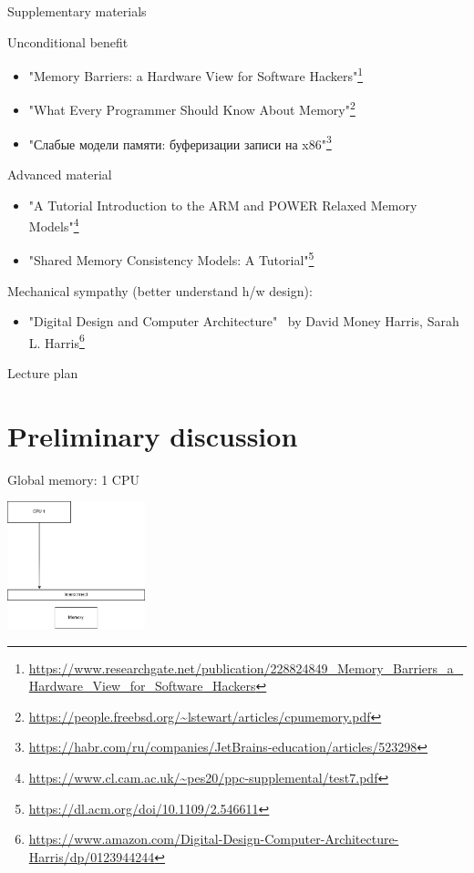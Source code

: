 \begin{frame}{Supplementary materials}

Unconditional benefit
\begin{itemize}
  \item "Memory Barriers: a Hardware View for Software Hackers"\footnote{\tiny\url{https://www.researchgate.net/publication/228824849_Memory_Barriers_a_Hardware_View_for_Software_Hackers}}
  \item "What Every Programmer Should Know About Memory"\footnote{\tiny\url{https://people.freebsd.org/~lstewart/articles/cpumemory.pdf}}
  \item "Слабые модели памяти: буферизации записи на x86"\footnote{\tiny\url{https://habr.com/ru/companies/JetBrains-education/articles/523298}}
\end{itemize}

Advanced material
\begin{itemize}
  \item "A Tutorial Introduction to the ARM and POWER Relaxed Memory Models"\footnote{\tiny\url{https://www.cl.cam.ac.uk/~pes20/ppc-supplemental/test7.pdf}}
  \item "Shared Memory Consistency Models: A Tutorial"\footnote{\tiny\url{https://dl.acm.org/doi/10.1109/2.546611}}
\end{itemize}

Mechanical sympathy (better understand h/w design):
\begin{itemize}
  \item "Digital Design and Computer Architecture" \ by David Money Harris, Sarah L. Harris\footnote{\tiny\url{https://www.amazon.com/Digital-Design-Computer-Architecture-Harris/dp/0123944244}}
\end{itemize}

\end{frame}


\begin{frame}{Lecture plan}
\tableofcontents
\end{frame}


\section{Preliminary discussion}


\begin{frame}{Global memory: 1 CPU}

\begin{center}
  \includegraphics[width=0.3\textwidth]{./pics/processor/1.png}
\end{center}

\end{frame}

